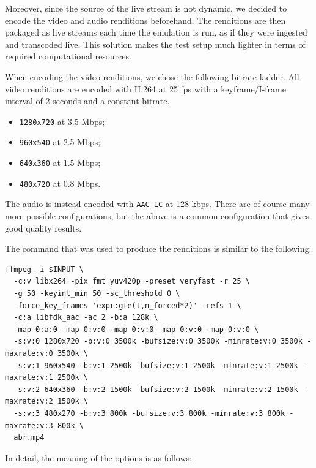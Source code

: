 Moreover, since the source of the live stream is not dynamic, we decided to encode the video and audio renditions beforehand. The renditions are then packaged as live streams each time the emulation is run, as if they were ingested and transcoded live. This solution makes the test setup much lighter in terms of required computational resources.

When encoding the video renditions, we chose the following bitrate ladder. All video renditions are encoded with H.264 at 25 fps with a keyframe/I-frame interval of 2 seconds and a constant bitrate.

\begin{itemize}
    \item \texttt{1280x720} at 3.5 Mbps;
    \item \texttt{960x540} at 2.5 Mbps;
    \item \texttt{640x360} at 1.5 Mbps;
    \item \texttt{480x720} at 0.8 Mbps.
\end{itemize}

The audio is instead encoded with \texttt{AAC-LC} at 128 kbps. There are of course many more possible configurations, but the above is a common configuration that gives good quality results.\cite{ozer}

The \ffmpeg{} command that was used to produce the renditions is similar to the following:

\begin{verbatim}
ffmpeg -i $INPUT \
  -c:v libx264 -pix_fmt yuv420p -preset veryfast -r 25 \
  -g 50 -keyint_min 50 -sc_threshold 0 \
  -force_key_frames 'expr:gte(t,n_forced*2)' -refs 1 \
  -c:a libfdk_aac -ac 2 -b:a 128k \
  -map 0:a:0 -map 0:v:0 -map 0:v:0 -map 0:v:0 -map 0:v:0 \
  -s:v:0 1280x720 -b:v:0 3500k -bufsize:v:0 3500k -minrate:v:0 3500k -maxrate:v:0 3500k \
  -s:v:1 960x540 -b:v:1 2500k -bufsize:v:1 2500k -minrate:v:1 2500k -maxrate:v:1 2500k \
  -s:v:2 640x360 -b:v:2 1500k -bufsize:v:2 1500k -minrate:v:2 1500k -maxrate:v:2 1500k \
  -s:v:3 480x270 -b:v:3 800k -bufsize:v:3 800k -minrate:v:3 800k -maxrate:v:3 800k \
  abr.mp4
\end{verbatim}

In detail, the meaning of the options is as follows:

